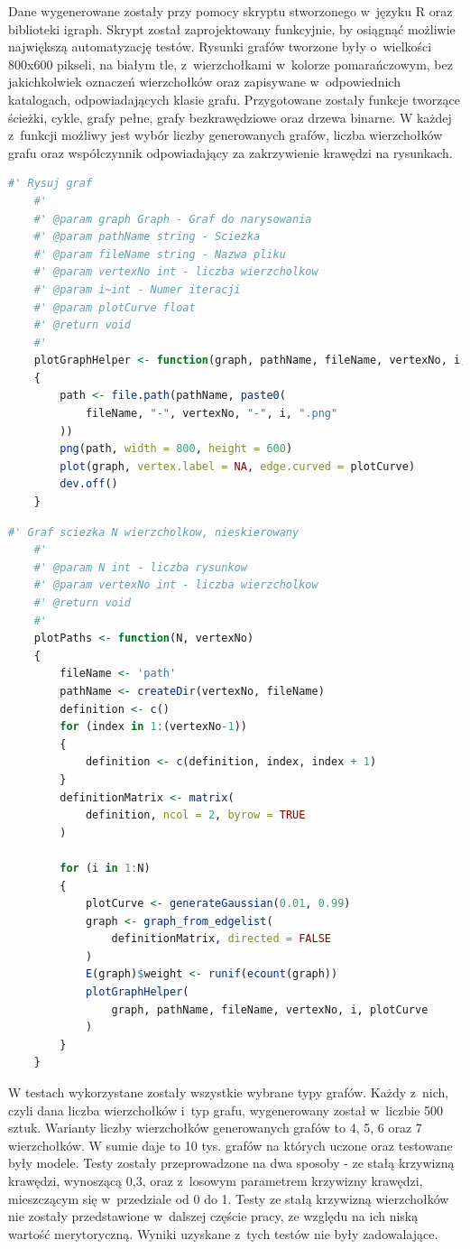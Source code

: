 Dane wygenerowane zostały przy pomocy skryptu stworzonego w~języku R oraz biblioteki igraph.
Skrypt został zaprojektowany funkcyjnie, by osiągnąć możliwie największą automatyzację testów.
Rysunki grafów tworzone były o~wielkości 800x600 pikseli, na białym tle, z~wierzchołkami w~kolorze pomarańczowym,
bez jakichkolwiek oznaczeń wierzchołków oraz zapisywane w~odpowiednich katalogach, odpowiadających klasie grafu.
Przygotowane zostały funkcje tworzące ścieżki, cykle, grafy pełne, grafy bezkrawędziowe oraz drzewa binarne.
W każdej z~funkcji możliwy jest wybór liczby generowanych grafów, liczba wierzchołków grafu
oraz współczynnik odpowiadający za zakrzywienie krawędzi na rysunkach.

\begin{lstlisting}[language=R,caption=Listing skryptu rysującego grafy,label={tests-generation-1}]
	#' Rysuj graf
	#'
	#' @param graph Graph - Graf do narysowania
	#' @param pathName string - Sciezka
	#' @param fileName string - Nazwa pliku
	#' @param vertexNo int - liczba wierzcholkow
	#' @param i~int - Numer iteracji
	#' @param plotCurve float
	#' @return void
	#'
	plotGraphHelper <- function(graph, pathName, fileName, vertexNo, i, plotCurve)
	{
		path <- file.path(pathName, paste0(
			fileName, "-", vertexNo, "-", i, ".png"
		))
		png(path, width = 800, height = 600)
		plot(graph, vertex.label = NA, edge.curved = plotCurve)
		dev.off()
	}	
\end{lstlisting}

\begin{lstlisting}[language=R,caption=Listing funkcji tworzącej ścieżkę,label={tests-generation-2}]
	#' Graf sciezka N wierzcholkow, nieskierowany
	#'
	#' @param N int - liczba rysunkow
	#' @param vertexNo int - liczba wierzcholkow
	#' @return void
	#'
	plotPaths <- function(N, vertexNo)
	{
		fileName <- 'path'
		pathName <- createDir(vertexNo, fileName)
		definition <- c()
		for (index in 1:(vertexNo-1))
		{
			definition <- c(definition, index, index + 1)
		}
		definitionMatrix <- matrix(
			definition, ncol = 2, byrow = TRUE
		)
		
		for (i in 1:N)
		{
			plotCurve <- generateGaussian(0.01, 0.99)
			graph <- graph_from_edgelist(
				definitionMatrix, directed = FALSE
			)
			E(graph)$weight <- runif(ecount(graph))
			plotGraphHelper(
				graph, pathName, fileName, vertexNo, i, plotCurve
			)
		}
	}
\end{lstlisting}

W testach wykorzystane zostały wszystkie wybrane typy grafów.
Każdy z~nich, czyli dana liczba wierzchołków i~typ grafu, wygenerowany został w~liczbie 500 sztuk.
Warianty liczby wierzchołków generowanych grafów to 4, 5, 6 oraz 7 wierzchołków.
W sumie daje to 10 tys. grafów na których uczone oraz testowane były modele.
Testy zostały przeprowadzone na dwa sposoby - ze stałą krzywizną krawędzi, wynoszącą 0,3,
oraz z~losowym parametrem krzywizny krawędzi, mieszczącym się w~przedziale od 0 do 1.
Testy ze stałą krzywizną wierzchołków nie zostały przedstawione w~dalszej częście pracy,
ze względu na ich niską wartość merytoryczną. Wyniki uzyskane z~tych testów nie były zadowalające.

